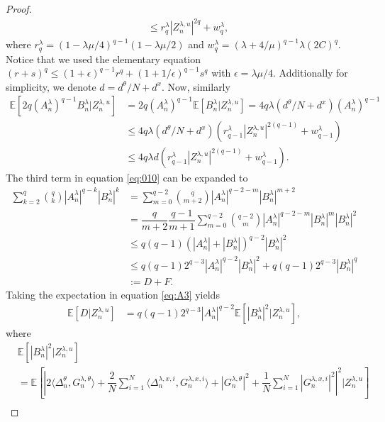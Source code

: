 \documentclass[a4paper, 10pt]{article}
\theoremstyle{plain}%
\begin{document}
\begin{proof}
\begin{align}
&\leq r_q^{\lambda}|Z_n^{\lambda,u}|^{2q}+w_q^{\lambda},\label{eq:A1}
\end{align}
where $r_q^{\lambda}=(1-\lambda\mu/4)^{q-1}(1-\lambda\mu/2)$ and $w_q^{\lambda}=(\lambda+4/\mu)^{q-1}\lambda (2C)^q$. Notice that we used the elementary equation $(r+s)^q\leq(1+\epsilon)^{q-1}r^q+(1+1/\epsilon)^{q-1}s^q$ with $\epsilon=\lambda\mu/4$. Additionally for simplicity, we denote $d=d^{\theta}/N+d^x$. Now, similarly
\begin{align}
\mathbb{E}\left[2q(A_n^{\lambda})^{q-1}B^{\lambda}_n|Z_n^{\lambda,u}\right]&=2q(A_n^{\lambda})^{q-1}\mathbb{E}\left[B^{\lambda}_n|Z_n^{\lambda,u}\right]=4q\lambda\left(d^{\theta}/N+d^x\right)(A_n^{\lambda})^{q-1}\nonumber\\
&\leq 4q\lambda\left(d^{\theta}/N+d^x\right) \left(r_{q-1}^{\lambda}|Z_n^{\lambda,u}|^{2(q-1)}+w_{q-1}^{\lambda}\right)\nonumber\\
&\leq  4q\lambda d \left(r_{q-1}^{\lambda}|Z_n^{\lambda,u}|^{2(q-1)}+w_{q-1}^{\lambda}\right).\label{eq:A2}
\end{align}
The third term in equation \eqref{eq:010} can be expanded to
\begin{align}
\sum_{k=2}^q\binom{q}{k}|A_n^{\lambda}|^{q-k}|B^{\lambda}_n|^k&=\sum_{m=0}^{q-2}\binom{q}{m+2}|A_n^{\lambda}|^{q-2-m}|B^{\lambda}_n|^{m+2}\nonumber\\
&=\dfrac{q}{m+2}\dfrac{q-1}{m+1}\sum_{m=0}^{q-2}\binom{q-2}{m}|A_n^{\lambda}|^{q-2-m}|B^{\lambda}_n|^{m}|B^{\lambda}_n|^{2}\nonumber\\
&\leq q(q-1)\left(|A_n^{\lambda}|+|B_n^{\lambda}|\right)^{q-2}|B^{\lambda}_n|^2\nonumber\\
&\leq q(q-1)2^{q-3}|A_n^{\lambda}|^{q-2}|B_n^{\lambda}|^2+q(q-1)2^{q-3}|B_n^{\lambda}|^q\nonumber\\
&:=D+F.\label{eq:A3}
\end{align}
Taking the expectation in equation \eqref{eq:A3} yields
\begin{align*}
\mathbb{E}[D|Z_n^{\lambda,u}]&=q(q-1)2^{q-3}|A_n^{\lambda}|^{q-2}\mathbb{E}\left[|B_n^{\lambda}|^2|Z_n^{\lambda,u}\right],
\end{align*}
where
\begin{align*}
&\mathbb{E}\left[|B_n^{\lambda}|^2|Z_n^{\lambda,u}\right]\\&=\mathbb{E}\left[{\left|2\langle{ \Delta_n^{\theta},G_n^{\lambda,\theta}}\rangle+\dfrac{2}{N}\sum_{i=1}^N\langle{ \Delta_n^{\lambda,x,i},G_n^{\lambda,x,i}}\rangle+{\left|G_n^{\lambda,\theta}\right|}^2+\dfrac{1}{N}\sum_{i=1}^N{\left|G_n^{\lambda,x,i}\right|}^2\right|}^2|Z_n^{\lambda,u}\right]\\

\end{align*}
\end{proof}
\end{document}

